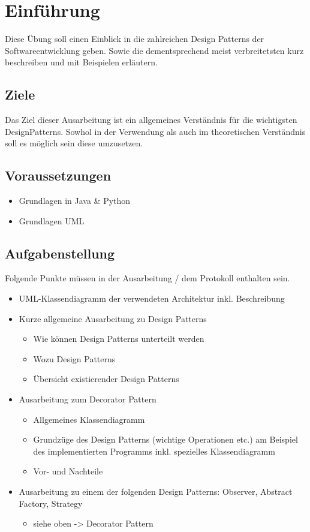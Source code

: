 
\section{Einführung}
Diese Übung soll einen Einblick in die zahlreichen Design Patterns der Softwareentwicklung geben. Sowie die dementsprechend meist verbreitetsten kurz beschreiben und mit Beispielen erläutern.

\subsection{Ziele}
Das Ziel dieser Ausarbeitung ist ein allgemeines Verständnis für die wichtigsten DesignPatterns. Sowhol in der Verwendung als auch im theoretischen Verständnis soll es möglich sein diese umzusetzen.

\subsection{Voraussetzungen}
\begin{itemize}
	\item Grundlagen in Java \& Python
	\item Grundlagen UML
\end{itemize}

\subsection{Aufgabenstellung}
Folgende Punkte müssen in der Ausarbeitung / dem Protokoll enthalten sein.
\begin{itemize}
	\item UML-Klassendiagramm der verwendeten Architektur inkl. Beschreibung
	\item Kurze allgemeine Ausarbeitung zu Design Patterns
	\begin{itemize}
		\item[\Checkmark] Wie können Design Patterns unterteilt werden
		\item[\Checkmark] Wozu Design Patterns
		\item[\Checkmark] Übersicht existierender Design Patterns
	\end{itemize}
	\item Ausarbeitung zum Decorator Pattern
	\begin{itemize}
		\item[\Checkmark] Allgemeines Klassendiagramm
		\item[\Checkmark] Grundzüge des Design Patterns (wichtige Operationen etc.) am Beispiel des implementierten Programms inkl. spezielles Klassendiagramm
		\item[\Checkmark] Vor- und Nachteile
	\end{itemize}
	\item Ausarbeitung zu einem der folgenden Design Patterns: Observer, Abstract Factory, Strategy
	\begin{itemize}
		\item[\Checkmark] siehe oben -> Decorator Pattern
	\end{itemize}
\end{itemize}
\clearpage
